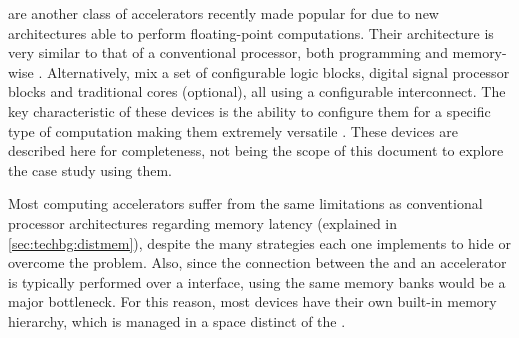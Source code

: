\documentclass[../thesis]{subfiles}
\begin{document}
	\dsps are another class of accelerators recently made popular for \hpc due to new architectures able to perform floating-point computations. Their architecture is very similar to that of a conventional processor, both programming and memory-wise \cite{FLAWN61}. Alternatively, \fpgas mix a set of configurable logic blocks, digital signal processor blocks and traditional \cpu cores (optional), all using a configurable interconnect. The key characteristic of these devices is the ability to configure them for a specific type of computation making them extremely versatile \cite{Brodtkorb:2010}. These devices are described here for completeness, not being the scope of this document to explore the case study using them.

	Most computing accelerators suffer from the same limitations as conventional processor architectures regarding memory latency (explained in \cref{sec:techbg:distmem}), despite the many strategies each one implements to hide or overcome the problem. Also, since the connection between the \cpu and an accelerator is typically performed over a \pcie interface, using the same memory banks would be a major bottleneck. For this reason, most devices have their own built-in memory hierarchy, which is managed in a space distinct of the \cpus.
\end{document}
